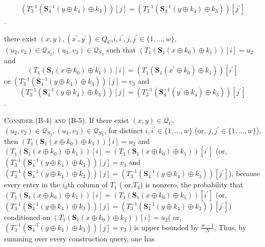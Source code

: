   $$
  \begin{aligned}
  \left(T_{3}^{-1}\left(\mathbf{S}_{4}^{-1}\left(y \oplus k_{4}\right) \oplus k_{3}\right)\right)[j]=\left(T_{3}^{-1}\left(\mathbf{S}_{4}^{-1}\left(y \oplus k_{4}\right) \oplus k_{3}\right)\right)[j^{\prime}]
  \end{aligned}
  $$.
  \item[(B-5)]
  there exist $(x, y),(x^{\prime}, y^{\prime}) \in Q_{C}$,$i,i^{\prime},j,j^{\prime} \in\{1, \ldots, w\}$,$\left(u_{2}, v_{2}\right) \in \mathcal{Q}_{S_{2}},\left(u_{3}, v_{3}\right) \in \mathcal{Q}_{S_{3}}$ such that $\left(T_{1}\left(\mathbf{S}_{1}\left(x \oplus k_{0}\right) \oplus k_{1}\right)\right)[i]=u_2$ and $$\left(T_{1}\left(\mathbf{S}_{1}\left(x \oplus k_{0}\right) \oplus k_{1}\right)\right)[i]=\left(T_{1}\left(\mathbf{S}_{1}\left(x^{\prime} \oplus k_{0}\right) \oplus k_{1}\right)\right)[i^{\prime}]$$ or $\left(T_{3}^{-1}\left(\mathbf{S}_{4}^{-1}\left(y \oplus k_{4}\right) \oplus k_{3}\right)\right)[j]=v_3$ and $$\left(T_{3}^{-1}\left(\mathbf{S}_{4}^{-1}\left(y \oplus k_{4}\right) \oplus k_{3}\right)\right)[j]=\left(T_{3}^{-1}\left(\mathbf{S}_{4}^{-1}\left(y^{\prime} \oplus k_{4}\right) \oplus k_{3}\right)\right)[j^{\prime}]$$.
  
  
  
  
  \noindent \textsc{Consider (B-4) and (B-5)}. If there exist $(x, y) \in \mathcal{Q}_{C}$, $\left(u_{2}, v_{2}\right) \in \mathcal{Q}_{S_{2}}, \left(u_{3}, v_{3}\right) \in \mathcal{Q}_{S_{3}}$, for distinct $i,i^{\prime} \in\{1, \ldots, w\}$ (or, $j,j^{\prime} \in\{1, \ldots, w\}$), then $\left(T_{1}\left(\mathbf{S}_{1}\left(x \oplus k_{0}\right) \oplus k_{1}\right)\right)[i] = u_2$ and $\left(T_{1}\left(\mathbf{S}_{1}\left(x \oplus k_{0}\right) \oplus k_{1}\right)\right)[i] = \left(T_{1}\left(\mathbf{S}_{1}\left(x \oplus k_{0}\right) \oplus k_{1}\right)\right)[i^{\prime}]$ (or,$\left(T_{3}^{-1}\left(\mathbf{S}_{4}^{-1}\left(y \oplus k_{4}\right) \oplus k_{3}\right)\right)[j] = v_3$ and $\left(T_{3}^{-1}\left(\mathbf{S}_{4}^{-1}\left(y \oplus k_{4}\right) \oplus k_{3}\right)\right)[j] = \left(T_{3}^{-1}\left(\mathbf{S}_{4}^{-1}\left(y \oplus k_{4}\right) \oplus k_{3}\right)\right)[j^{\prime}]$), because every entry in the $i_{0}$th column of $T_{1}$ ( or,$T_{3}$) is nonzero, the probability that $\left(T_{1}\left(\mathbf{S}_{1}\left(x \oplus k_{0}\right) \oplus k_{1}\right)\right)[i] = \left(T_{1}\left(\mathbf{S}_{1}\left(x \oplus k_{0}\right) \oplus k_{1}\right)\right)[i^{\prime}]$ (or, $\left(T_{3}^{-1}\left(\mathbf{S}_{4}^{-1}\left(y \oplus k_{4}\right) \oplus k_{3}\right)\right)[j] = \left(T_{3}^{-1}\left(\mathbf{S}_{4}^{-1}\left(y \oplus k_{4}\right) \oplus k_{3}\right)\right)[j^{\prime}]$) conditioned on $\left(T_{1}\left(\mathbf{S}_{1}\left(x \oplus k_{0}\right) \oplus k_{1}\right)\right)[i] = u_2$( or,$\left(T_{3}^{-1}\left(\mathbf{S}_{4}^{-1}\left(y \oplus k_{4}\right) \oplus k_{3}\right)\right)[j] = v_3$ ) is upper bounded by $\frac{w-1}{N}$, Thus, by summing over every construction query, one has

